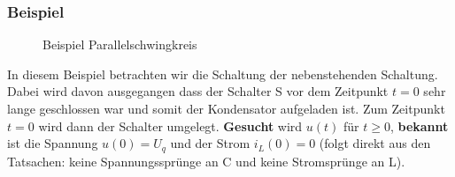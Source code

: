 \subsubsection{Beispiel}
\begin{wrapfigure}{l}{0.55\textwidth}
	\centering
	
	\caption{Beispiel Parallelschwingkreis}
	\label{fig:ParallelSkBsp}
\end{wrapfigure}
In diesem Beispiel betrachten wir die Schaltung der nebenstehenden Schaltung.
Dabei wird davon ausgegangen dass der Schalter S vor dem Zeitpunkt $t = 0$ sehr
lange geschlossen war und somit der Kondensator aufgeladen ist. Zum Zeitpunkt
$t=0$ wird dann der Schalter umgelegt. \textbf{Gesucht} wird $u(t)$ für $t \geq
0$, \textbf{bekannt} ist die Spannung $u(0) = U_q$ und der Strom $i_L(0) = 0$
(folgt direkt aus den Tatsachen: keine Spannungssprünge an C und keine
Stromsprünge an L). \\

